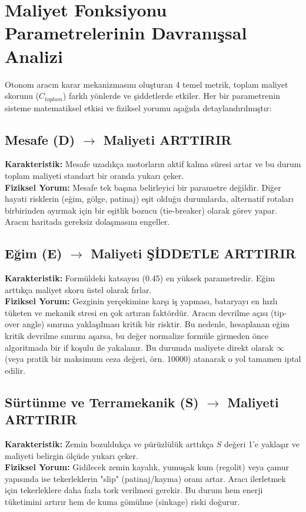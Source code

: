 \documentclass[12pt,a4paper]{article}
\begin{document}
\section{Maliyet Fonksiyonu Parametrelerinin Davranışsal Analizi}
Otonom aracın karar mekanizmasını oluşturan 4 temel metrik, toplam maliyet skorunu ($C_{toplam}$) farklı yönlerde ve şiddetlerde etkiler. Her bir parametrenin sisteme matematiksel etkisi ve fiziksel yorumu aşağıda detaylandırılmıştır:

\subsection{Mesafe (D) $\rightarrow$ Maliyeti ARTTIRIR}
\textbf{Karakteristik:} Mesafe uzadıkça motorların aktif kalma süresi artar ve bu durum toplam maliyeti standart bir oranda yukarı çeker. \\
\textbf{Fiziksel Yorum:} Mesafe tek başına belirleyici bir parametre değildir. Diğer hayati risklerin (eğim, gölge, patinaj) eşit olduğu durumlarda, alternatif rotaları birbirinden ayırmak için bir eşitlik bozucu (tie-breaker) olarak görev yapar. Aracın haritada gereksiz dolaşmasını engeller.

\subsection{Eğim (E) $\rightarrow$ Maliyeti ŞİDDETLE ARTTIRIR}
\textbf{Karakteristik:} Formüldeki katsayısı (0.45) en yüksek parametredir. Eğim arttıkça maliyet skoru üstel olarak fırlar. \\
\textbf{Fiziksel Yorum:} Gezginin yerçekimine karşı iş yapması, bataryayı en hızlı tüketen ve mekanik stresi en çok artıran faktördür. Aracın devrilme açısı (tip-over angle) sınırına yaklaşılması kritik bir risktir. Bu nedenle, hesaplanan eğim kritik devrilme sınırını aşarsa, bu değer normalize formüle girmeden önce algoritmada bir if koşulu ile yakalanır. Bu durumda maliyete direkt olarak $\infty$ (veya pratik bir maksimum ceza değeri, örn. 10000) atanarak o yol tamamen iptal edilir.

\subsection{Sürtünme ve Terramekanik (S) $\rightarrow$ Maliyeti ARTTIRIR}
\textbf{Karakteristik:} Zemin bozuldukça ve pürüzlülük arttıkça $S$ değeri 1’e yaklaşır ve maliyeti belirgin ölçüde yukarı çeker. \\
\textbf{Fiziksel Yorum:} Gidilecek zemin kayalık, yumuşak kum (regolit) veya çamur yapısında ise tekerleklerin "slip" (patinaj/kayma) oranı artar. Aracı ilerletmek için tekerleklere daha fazla tork verilmesi gerekir. Bu durum hem enerji tüketimini artırır hem de kuma gömülme (sinkage) riski doğurur.
\end{document}
